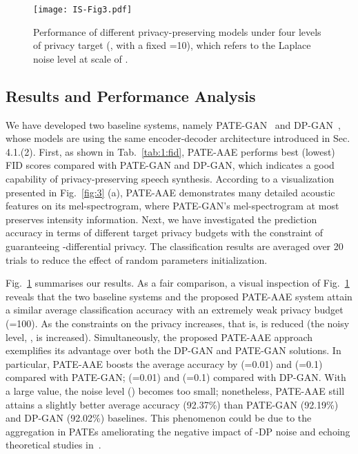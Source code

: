 \documentclass[a4paper]{article}
\begin{document}
\begin{figure}[ht!]
    \centering
    \texttt{[image: IS-Fig3.pdf]}
    \caption{Performance of different privacy-preserving models under four levels of privacy target (, with a fixed =10), which refers to the Laplace noise level at scale of . }
    \label{fig:4}
\end{figure}

\subsection{Results and Performance Analysis}
We have developed two baseline systems, namely  PATE-GAN~\cite{jordon2019pate} and DP-GAN~\cite{xie2018differentially}, whose models are using the same encoder-decoder architecture introduced in Sec. 4.1.(2). First, as shown in Tab.~\ref{tab:1:fid}, PATE-AAE performs best (lowest) FID scores compared with PATE-GAN and DP-GAN, which indicates a good capability of privacy-preserving speech synthesis. According to a visualization presented in Fig.~\ref{fig:3} (a), PATE-AAE demonstrates many detailed acoustic features on its mel-spectrogram, where PATE-GAN's mel-spectrogram at most preserves intensity information. Next, we have investigated the prediction accuracy in terms of different target privacy budgets with the constraint of guaranteeing -differential privacy. The classification results are averaged over 20 trials to reduce the effect of random parameters initialization.

Fig.~\ref{fig:4} summarises our results. As a fair comparison, a visual inspection of Fig.~\ref{fig:4} reveals that the two baseline systems and the proposed PATE-AAE system attain a similar average classification accuracy with an extremely weak privacy budget (=100).
As the constraints on the privacy increases, that is,  is reduced (the noisy level, , is increased). Simultaneously, the proposed PATE-AAE approach exemplifies its advantage over both the DP-GAN and PATE-GAN solutions. In particular, PATE-AAE boosts the average accuracy by  (=0.01) and  (=0.1) compared with PATE-GAN;  (=0.01) and  (=0.1) compared with DP-GAN. With a large  value, the noise level () becomes too small; nonetheless, PATE-AAE still attains a slightly better average accuracy (92.37\%) than PATE-GAN (92.19\%) and DP-GAN (92.02\%) baselines. This phenomenon could be due to the aggregation in PATEs ameliorating the negative impact of -DP noise and echoing theoretical studies in~\cite{papernot2018scalable, jordon2019pate, chen2020gs}.
\end{document}
